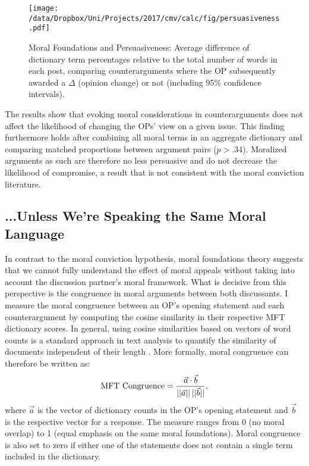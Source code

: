 \begin{figure}[ht]
\centering
\texttt{[image: /data/Dropbox/Uni/Projects/2017/cmv/calc/fig/persuasiveness.pdf]}
\caption[Moral Foundations and Persuasiveness]{Moral Foundations and Persuasiveness: Average difference of dictionary term percentages relative to the total number of words in each post, comparing counterarguments where the OP subsequently awarded a $\Delta$ (opinion change) or not (including 95\% confidence intervals).}\label{fig:persuasiveness}
\end{figure}

The results show that evoking moral considerations in counterarguments does not affect the likelihood of changing the OPs' view on a given issue. This finding furthermore holds after combining all moral terms in an aggregate dictionary and comparing matched proportions between argument pairs ($p > .34$). Moralized arguments as such are therefore no less persuasive and do not decrease the likelihood of compromise, a result that is not consistent with the moral conviction literature.



\subsection{...Unless We're Speaking the Same Moral Language}

In contrast to the moral conviction hypothesis, moral foundations theory suggests that we cannot fully understand the effect of moral appeals without taking into account the discussion partner's moral framework.  What is decisive from this perspective is the congruence in moral arguments between both discussants. I measure the moral congruence between an OP's opening statement and each counterargument by computing the cosine similarity in their respective MFT dictionary scores. In general, using cosine similarities based on vectors of word counts is a standard approach in text analysis to quantify the similarity of documents independent of their length \citep[e.g.,][]{manning2008introduction}. More formally, moral congruence can therefore be written as:
\begin{equation}
\text{MFT Congruence}=\dfrac{\vec{a}\cdot \vec{b}}{||\vec{a}||\hspace{.2em}||\vec{b}||},
\end{equation}
where $\vec{a}$ is the vector of dictionary counts in the OP's opening statement and $\vec{b}$ is the respective vector for a response. The measure ranges from 0 (no moral overlap) to 1 (equal emphasis on the same moral foundations). Moral congruence is also set to zero if either one of the statements does not contain a single term included in the dictionary.

